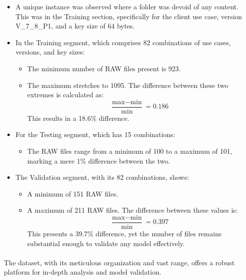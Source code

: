            \begin{itemize}
                \item A unique instance was observed where a folder was devoid of any content. This was in the Training section, specifically for the client use case, version V\_7\_8\_P1, and a key size of 64 bytes.
                \item In the Training segment, which comprises 82 combinations of use cases, versions, and key sizes:
                \begin{itemize}
                    \item The minimum number of RAW files present is 923.
                    \item The maximum stretches to 1095. The difference between these two extremes is calculated as:
                    \begin{equation}
                        \frac{\text{max} - \text{min}}{\text{min}} = 0.186
                    \end{equation}
                    This results in a 18.6\% difference.
                \end{itemize}
                \item For the Testing segment, which has 15 combinations:
                \begin{itemize}
                    \item The RAW files range from a minimum of 100 to a maximum of 101, marking a mere 1\% difference between the two.
                \end{itemize}
                \item The Validation segment, with its 82 combinations, shows:
                \begin{itemize}
                    \item A minimum of 151 RAW files.
                    \item A maximum of 211 RAW files. The difference between these values is:
                    \begin{equation}
                        \frac{\text{max} - \text{min}}{\text{min}} = 0.397
                    \end{equation}
                    This presents a 39.7\% difference, yet the number of files remains substantial enough to validate any model effectively.
                \end{itemize}
            \end{itemize}
            
            \paragraph{}The dataset, with its meticulous organization and vast range, offers a robust platform for in-depth analysis and model validation.
            
